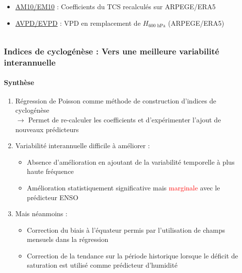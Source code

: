 \documentclass[aspectratio=169, usepdftitle=false, xcolor={dvipsnames}, 9pt,table]{beamer}
\begin{document}
\begin{frame}[t]
\begin{columns}
\begin{column}{0.3\textwidth}
\begin{examples}[Indices]
\begin{itemize}
                    \item \underline{AM10/EM10} : Coefficients du TCS recalculés sur ARPEGE/ERA5
                    \item \underline{AVPD/EVPD} : VPD en remplacement de $H_\text{600~hPa}$ (ARPEGE/ERA5) 
                \end{itemize}
            \end{examples}
            \vspace{1em}
        \end{column}
    \end{columns}
\end{frame}

\begin{frame}[c]
    \frametitle{Indices de cyclogénèse : Vers une meilleure variabilité interannuelle}
    \framesubtitle{Synthèse}
    \begin{block}[Synthèse]
        \small
        \begin{enumerate}
            \setlength\itemsep{1em}
            \item<1-> \alert{Régression de Poisson} comme méthode  de construction d'indices de cyclogénèse\\
                \vspace{0.8ex}
                $\longrightarrow$ Permet de re-calculer les coefficients et d'expérimenter l'ajout de nouveaux prédicteurs
            \item<2-> Variabilité interannuelle \alert{difficile} à améliorer :
                \begin{itemize}
                    \item Absence d'amélioration en ajoutant de la variabilité temporelle à plus haute fréquence
                    \item Amélioration statistiquement \alert{significative} mais \textcolor{red}{marginale} avec le prédicteur ENSO 
                \end{itemize}
            \item<3-> Mais néanmoins :
                \begin{itemize}
                    \item Correction du biais à l'équateur permis par l'utilisation de champs mensuels dans la régression
                    \item Correction de la tendance sur la période historique lorsque le déficit de saturation est utilisé comme prédicteur d'humidité
                \end{itemize}
        \end{enumerate}
    \end{block}
\end{frame}
\end{document}
